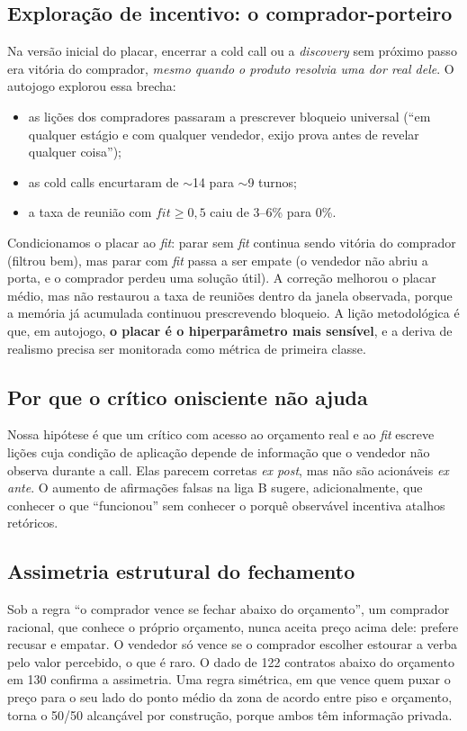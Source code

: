 \documentclass[11pt,a4paper]{article}
\begin{document}
\subsection{Exploração de incentivo: o comprador-porteiro}
\label{sec:incentivo}
Na versão inicial do placar, encerrar a cold call ou a \emph{discovery} sem próximo passo era vitória do comprador, \emph{mesmo quando o produto resolvia uma dor real dele}. O autojogo explorou essa brecha:
\begin{itemize}
  \item as lições dos compradores passaram a prescrever bloqueio universal (``em qualquer estágio e com qualquer vendedor, exijo prova antes de revelar qualquer coisa'');
  \item as cold calls encurtaram de $\sim$14 para $\sim$9 turnos;
  \item a taxa de reunião com $\textit{fit}\ge0{,}5$ caiu de 3--6\% para 0\%.
\end{itemize}
Condicionamos o placar ao \emph{fit}: parar sem \emph{fit} continua sendo vitória do comprador (filtrou bem), mas parar com \emph{fit} passa a ser empate (o vendedor não abriu a porta, e o comprador perdeu uma solução útil). A correção melhorou o placar médio, mas não restaurou a taxa de reuniões dentro da janela observada, porque a memória já acumulada continuou prescrevendo bloqueio. A lição metodológica é que, em autojogo, \textbf{o placar é o hiperparâmetro mais sensível}, e a deriva de realismo precisa ser monitorada como métrica de primeira classe.

\subsection{Por que o crítico onisciente não ajuda}
Nossa hipótese é que um crítico com acesso ao orçamento real e ao \emph{fit} escreve lições cuja condição de aplicação depende de informação que o vendedor não observa durante a call. Elas parecem corretas \emph{ex post}, mas não são acionáveis \emph{ex ante}. O aumento de afirmações falsas na liga B sugere, adicionalmente, que conhecer o que ``funcionou'' sem conhecer o porquê observável incentiva atalhos retóricos.

\subsection{Assimetria estrutural do fechamento}
Sob a regra ``o comprador vence se fechar abaixo do orçamento'', um comprador racional, que conhece o próprio orçamento, nunca aceita preço acima dele: prefere recusar e empatar. O vendedor só vence se o comprador escolher estourar a verba pelo valor percebido, o que é raro. O dado de 122 contratos abaixo do orçamento em 130 confirma a assimetria. Uma regra simétrica, em que vence quem puxar o preço para o seu lado do ponto médio da zona de acordo entre piso e orçamento, torna o 50/50 alcançável por construção, porque ambos têm informação privada.
\end{document}
